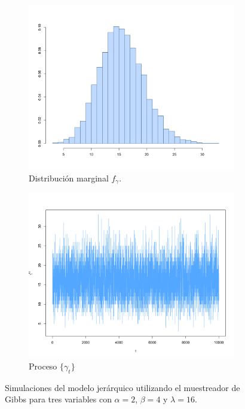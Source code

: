 \documentclass[11pt,a4paper]{article}
\begin{document}
\begin{figure}
     \vspace{0.2cm}
    
    \begin{subfigure}[t]{0.45\textwidth}
        \centering
        \includegraphics[width=\linewidth]{hier_hist_gamma.png} 
        \caption{Distribución marginal $f_\gamma$.} \label{fig:hier_hist_gamma}
    \end{subfigure}
    \hfill
    \begin{subfigure}[t]{0.45\textwidth}
        \centering
        \includegraphics[width=\linewidth]{hier_chain_gamma.png} 
        \caption{Proceso $\lbrace \gamma_t \rbrace$} \label{fig:hier_chain_gamma}
    \end{subfigure}
    
    \caption{Simulaciones del modelo jerárquico utilizando el muestreador de Gibbs para tres variables con $\alpha = 2$, $\beta = 4$ y $\lambda = 16$.}
    \label{fig:gs_hier}
\end{figure}
\end{document}
